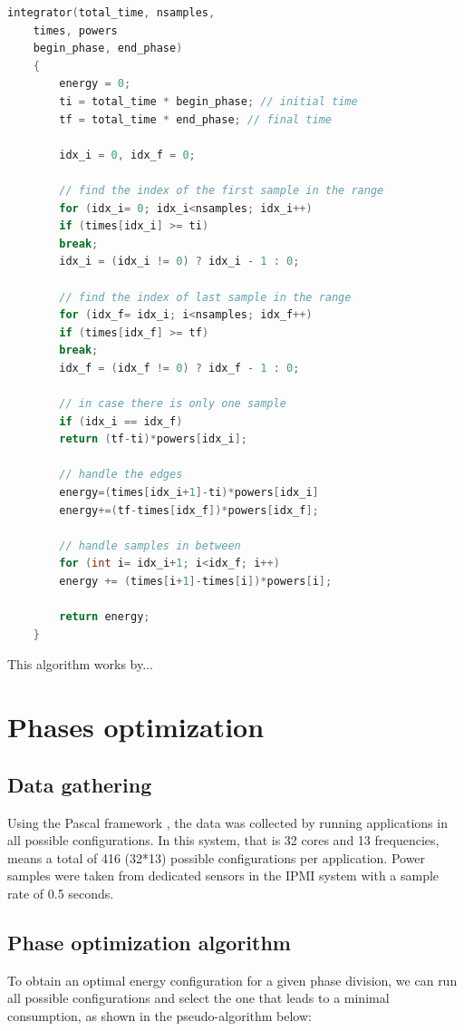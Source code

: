 \begin{lstlisting}[language=c++]
	integrator(total_time, nsamples,
	times, powers
	begin_phase, end_phase)
	{
		energy = 0;
		ti = total_time * begin_phase; // initial time
		tf = total_time * end_phase; // final time
		
		idx_i = 0, idx_f = 0;
		
		// find the index of the first sample in the range
		for (idx_i= 0; idx_i<nsamples; idx_i++)
		if (times[idx_i] >= ti)
		break;
		idx_i = (idx_i != 0) ? idx_i - 1 : 0;
		
		// find the index of last sample in the range
		for (idx_f= idx_i; i<nsamples; idx_f++)
		if (times[idx_f] >= tf)
		break;
		idx_f = (idx_f != 0) ? idx_f - 1 : 0;
		
		// in case there is only one sample
		if (idx_i == idx_f) 
		return (tf-ti)*powers[idx_i];
		
		// handle the edges
		energy=(times[idx_i+1]-ti)*powers[idx_i]
		energy+=(tf-times[idx_f])*powers[idx_f];
		
		// handle samples in between
		for (int i= idx_i+1; i<idx_f; i++)
		energy += (times[i+1]-times[i])*powers[i];
		
		return energy;
	}
\end{lstlisting}

This algorithm works by...

\section{Phases optimization} \label{sec:phases_optimization}

\subsection{Data gathering} \label{subsec:_phases_data_gathering}

Using the Pascal framework \cite{electronics11050689}, the data was collected by running applications in all possible configurations. In this system, that is 32 cores and 13 frequencies, means a total of 416 (32*13) possible configurations per application. Power samples were taken from dedicated sensors in the IPMI system with a sample rate of 0.5 seconds.

\subsection{Phase optimization algorithm} \label{subsec:phase_optimization_algorithm}
To obtain an optimal energy configuration for a given phase division, we can run all possible configurations and select the one that leads to a minimal consumption, as shown in the pseudo-algorithm below:

